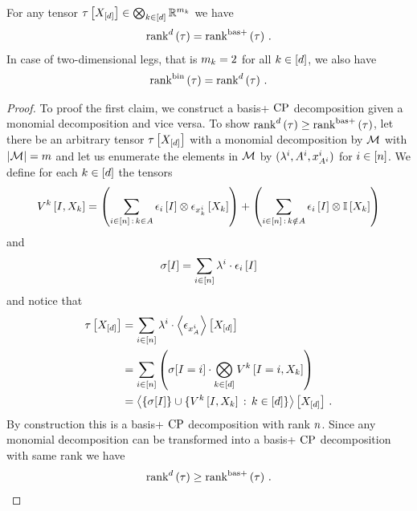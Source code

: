 \begin{theorem}
    For any tensor $\tau\left[X_{[d]}\right]\in\bigotimes_{k\in[d]} \mathbb{R}^{m_{k}}$ we have
    \begin{align*}
        \mathrm{rank}^{d}\left(\tau\right) = \mathrm{rank}^{\mathrm{bas+}}\left(\tau\right) \, .
    \end{align*}
    In case of two-dimensional legs, that is $m_{k}=2$ for all $k\in[d]$, we also have
    \begin{align*}
        \mathrm{rank}^{\mathrm{bin}}\left(\tau\right) = \mathrm{rank}^{d}\left(\tau\right)  \, .
    \end{align*}
\end{theorem}
\begin{proof}
    To proof the first claim, we construct a basis+ $\mathrm{CP}$ decomposition given a monomial decomposition and vice versa.
    To show $\mathrm{rank}^{d}\left(\tau\right) \geq \mathrm{rank}^{\mathrm{bas+}}\left(\tau\right)$, let there be an arbitrary tensor $\tau\left[X_{[d]}\right]$ with a monomial decomposition by $\mathcal{M}$ with $\left|\mathcal{M}\right|=m$ and let us enumerate the elements in $\mathcal{M}$ by $(\lambda^{i}, A^{i}, x_{A^{i}}^{i})$ for $i\in[n]$.
    We define for each $k\in[d]$ the tensors
    \begin{align*}
        V^{k}\left[I,X_{k}\right]
        = \left( \sum_{i\in[n] \, : \, k\in A} \epsilon_{i}\left[I\right] \otimes \epsilon_{x_{k}^{i}}\left[X_{k}\right] \right)
        + \left(\sum_{i\in[n] \, : \, k\notin A} \epsilon_{i}\left[I\right] \otimes \mathbb{I}\left[X_{k}\right] \right)
    \end{align*}
    and
    \begin{align*}
        \sigma[I] = \sum_{i\in[n]} \lambda^{i} \cdot \epsilon_{i}\left[I\right]
    \end{align*}
    and notice that
    \begin{align*}
        \tau\left[X_{[d]}\right]
        & = \sum_{i\in[n]} \lambda^{i} \cdot \left\langle \epsilon_{x_{A}^{i}}\right\rangle \left[ X_{[d]} \right] \\
        & = \sum_{i\in[n]} \left(  \sigma[I=i] \cdot \bigotimes_{k\in[d]} V^{k}\left[I=i, X_{k}\right] \right) \\
        & = \left\langle 
            \{\sigma[I]\} \cup \{V^{k}\left[I,X_{k}\right] \, : \, k\in[d] \}
        \right\rangle \left[ X_{[d]} \right] \, .
    \end{align*}
    By construction this is a basis+ $\mathrm{CP}$ decomposition with rank $n$.
    Since any monomial decomposition can be transformed into a basis+ $\mathrm{CP}$ decomposition with same rank we have
    \begin{align*}
        \mathrm{rank}^{d}\left(\tau\right) \geq \mathrm{rank}^{\mathrm{bas+}}\left(\tau\right) \, .
    \end{align*}


\end{proof}
